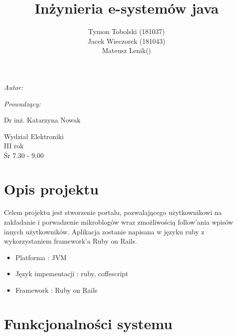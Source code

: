 \documentclass[wide,a4paper,titlepage,12pt] {article}
\title{Inżynieria e-systemów java}
\author{Tymon Tobolski (181037)\\ Jacek Wieczorek (181043) \\ Mateusz Lenik()}
\makeatletter
\renewcommand{\maketitle}{
\begin{titlepage}
  \begin{center}
    \vspace*{3cm}
    \LARGE \@title \par
    \vspace{2cm}
    \textit{\small Autor:}\par
    \normalsize \@author\par \normalsize
    \vspace{3cm}
    \textit{\small Prowadzący:}\par
    Dr inż. Katarzyna Nowak \par
    \vspace{2cm}
    Wydział Elektroniki\\ III rok\\ Śr 7.30 - 9.00\par

  \end{center}
\end{titlepage}
}
\makeatother
\begin{document}
\maketitle
  \section{Opis projektu}
  \paragraph{}
  Celem projektu jest stworzenie portalu, pozwalającego użytkownikowi na zakładanie i porwadzenie mikroblogów wraz zmożliwością follow'ania wpisów innych użytkowników. Aplikacja zostanie napisana w języku ruby z wykorzystaniem framework'a Ruby on Rails.
  \begin{itemize}
    \item Platforma : JVM
    \item Język impementacji : ruby, coffescript
    \item Framework : Ruby on Rails 
  \end{itemize}
  \section{Funkcjonalności systemu}
\end{document}
